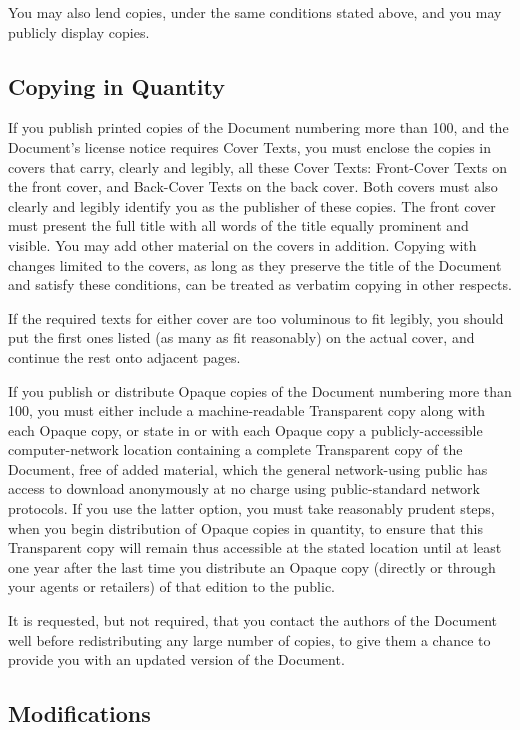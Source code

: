 	You may also lend copies, under the same conditions stated above, and you may publicly display copies. 

	\subsection{Copying in Quantity}

	If you publish printed copies of the Document numbering more than 100, and the Document's license notice requires Cover Texts, you must enclose the copies in covers that carry, clearly and legibly, all these Cover Texts: Front-Cover Texts on the front cover, and Back-Cover Texts on the back cover. Both covers must also clearly and legibly identify you as the publisher of these copies. The front cover must present the full title with all words of the title equally prominent and visible. You may add other material on the covers in addition. Copying with changes limited to the covers, as long as they preserve the title of the Document and satisfy these conditions, can be treated as verbatim copying in other respects. 

	If the required texts for either cover are too voluminous to fit legibly, you should put the first ones listed (as many as fit reasonably) on the actual cover, and continue the rest onto adjacent pages. 

	If you publish or distribute Opaque copies of the Document numbering more than 100, you must either include a machine-readable Transparent copy along with each Opaque copy, or state in or with each Opaque copy a publicly-accessible computer-network location containing a complete Transparent copy of the Document, free of added material, which the general network-using public has access to download anonymously at no charge using public-standard network protocols. If you use the latter option, you must take reasonably prudent steps, when you begin distribution of Opaque copies in quantity, to ensure that this Transparent copy will remain thus accessible at the stated location until at least one year after the last time you distribute an Opaque copy (directly or through your agents or retailers) of that edition to the public. 

	It is requested, but not required, that you contact the authors of the Document well before redistributing any large number of copies, to give them a chance to provide you with an updated version of the Document. 

	\subsection{Modifications}

